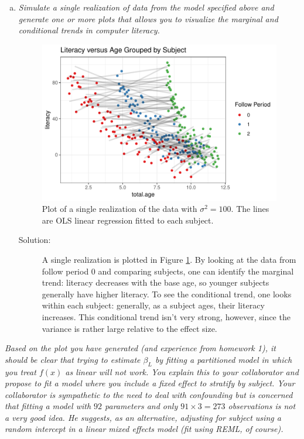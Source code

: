 \documentclass[11pt, letterpaper]{article}
\begin{document}
\begin{enumerate}[(a)]
\item{\em  Simulate a single realization of data from the model specified above and generate one or more plots that 
    allows you to visualize the marginal and conditional trends in computer literacy.}

  \begin{figure}
    \centering
    \includegraphics{literacy_versus_age.pdf}
    \caption{Plot of a single realization of the data with $\sigma^2 = 100$. The
      lines are OLS linear regression fitted to each subject.}
    \label{fig:literacy_versus_age}
  \end{figure}

  \begin{description}
  \item[Solution:] A single realization is plotted in Figure
    \ref{fig:literacy_versus_age}. By looking at the data from follow period $0$
    and comparing subjects, one can identify the marginal trend: literacy
    decreases with the base age, so younger subjects generally have higher
    literacy. To see the conditional trend, one looks within each subject:
    generally, as a subject ages, their literacy increases. This conditional
    trend isn't very strong, however, since the variance is rather large
    relative to the effect size.
  \end{description}
  
\end{enumerate}
{\em Based on the plot you have generated (and experience from homework 1), it should be clear that
trying to estimate $\beta_L$ by fitting a partitioned model in which you treat $f(x)$ as linear will not work.  
You explain this to your collaborator and propose to fit a model where you include a fixed effect to stratify by
subject.  Your collaborator is sympathetic to the need to deal with confounding but is concerned that fitting a model with $92$ parameters and only $91 \times 3=273$ observations is not a very good idea.  He suggests,
as an alternative, adjusting for subject using a random intercept in a linear mixed effects model (fit using REML, of course).}
\end{document}
